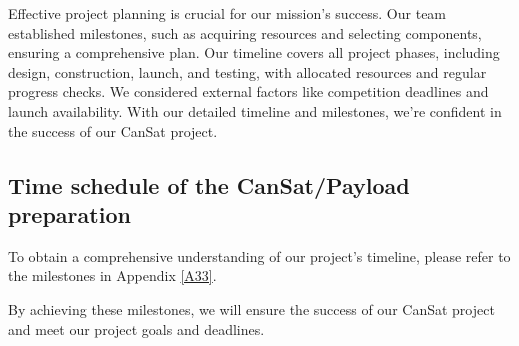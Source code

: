 Effective project planning is crucial for our mission's success. Our team established milestones, such as acquiring resources and selecting components, ensuring a comprehensive plan. Our timeline covers all project phases, including design, construction, launch, and testing, with allocated resources and regular progress checks. We considered external factors like competition deadlines and launch availability. With our detailed timeline and milestones, we're confident in the success of our CanSat project.

\subsection{Time schedule of the CanSat/Payload preparation}\label{time_schedule}
To obtain a comprehensive understanding of our project's timeline, please refer to the milestones in Appendix \ref{A33}. 

By achieving these milestones, we will ensure the success of our CanSat project and meet our project goals and deadlines.

